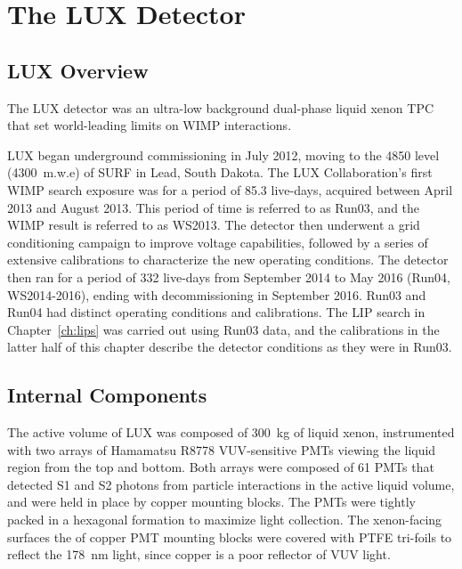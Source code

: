 \chapter{The LUX Detector}

\label{ch:LUX} %




\section{LUX Overview}
The \ac{LUX} detector was an ultra-low background dual-phase liquid xenon \ac{TPC} that set world-leading limits on \ac{WIMP} interactions.
 
\ac{LUX} began underground commissioning in July 2012, moving to the 4850 level (4300~m.w.e) of \ac{SURF} in Lead, South Dakota.  The \ac{LUX} Collaboration's first \ac{WIMP} search exposure was for a period of 85.3 live-days, acquired between April 2013 and August 2013. This period of time is referred to as Run03, and the \ac{WIMP} result is referred to as WS2013. The detector then underwent a grid conditioning campaign to improve voltage capabilities, followed by a series of extensive calibrations to characterize the new operating conditions. The detector then ran for a period of 332 live-days from September 2014 to May 2016 (Run04, WS2014-2016), ending with decommissioning in September 2016. Run03 and Run04 had distinct operating conditions and calibrations. The \ac{LIP} search in Chapter~\ref{ch:lips} was carried out using Run03 data, and the calibrations in the latter half of this chapter describe the detector conditions as they were in Run03. 

\section{Internal Components}
The active volume of \ac{LUX} was composed of 300~kg of liquid xenon, instrumented with two arrays of Hamamatsu R8778 \ac{VUV}-sensitive \ac{PMT}s viewing the liquid region from the top and bottom. Both arrays were composed of 61 \ac{PMT}s that detected S1 and S2 photons from particle interactions in the active liquid volume, and were held in place by copper mounting blocks. The \ac{PMT}s were tightly packed in a hexagonal formation to maximize light collection. The xenon-facing surfaces the of copper \ac{PMT} mounting blocks were covered with \ac{PTFE} tri-foils to reflect the 178~nm light, since copper is a poor reflector of \ac{VUV} light. 

